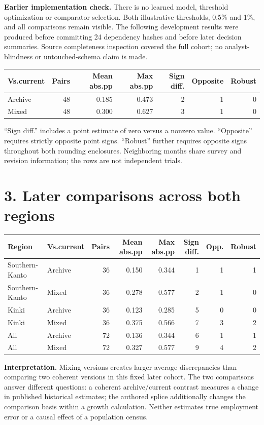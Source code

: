 \documentclass[10pt,letterpaper]{article}
\begin{document}
\textbf{Earlier implementation check.} There is no learned model, threshold optimization or comparator selection. Both illustrative thresholds, 0.5\% and 1\%, and all comparisons remain visible. The following development results were produced before committing 24 dependency hashes and before later decision summaries. Source completeness inspection covered the full cohort; no analyst-blindness or untouched-schema claim is made.
\begin{center}\small\begin{tabular}{@{}lrrrrrr@{}}\toprule
Vs.current & Pairs & Mean abs.pp & Max abs.pp & Sign diff. & Opposite & Robust\\\midrule
Archive & 48 & 0.185 & 0.473 & 2 & 1 & 0 \\
Mixed & 48 & 0.300 & 0.627 & 3 & 1 & 0 \\
\bottomrule\end{tabular}\end{center}
``Sign diff.'' includes a point estimate of zero versus a nonzero value. ``Opposite'' requires strictly opposite point signs. ``Robust'' further requires opposite signs throughout both rounding enclosures. Neighboring months share survey and revision information; the rows are not independent trials.
\newpage
\section*{3. Later comparisons across both regions}
\begin{center}\small\begin{tabular}{@{}llrrrrrr@{}}\toprule
Region & Vs.current & Pairs & Mean abs.pp & Max abs.pp & Sign diff. & Opp. & Robust\\\midrule
Southern-Kanto & Archive & 36 & 0.150 & 0.344 & 1 & 1 & 1 \\
Southern-Kanto & Mixed & 36 & 0.278 & 0.577 & 2 & 1 & 0 \\
Kinki & Archive & 36 & 0.123 & 0.285 & 5 & 0 & 0 \\
Kinki & Mixed & 36 & 0.375 & 0.566 & 7 & 3 & 2 \\
All & Archive & 72 & 0.136 & 0.344 & 6 & 1 & 1 \\
All & Mixed & 72 & 0.327 & 0.577 & 9 & 4 & 2 \\
\bottomrule\end{tabular}\end{center}
\textbf{Interpretation.} Mixing versions creates larger average discrepancies than comparing two coherent versions in this fixed later cohort. The two comparisons answer different questions: a coherent archive/current contrast measures a change in published historical estimates; the authored splice additionally changes the comparison basis within a growth calculation. Neither estimates true employment error or a causal effect of a population census.
\end{document}
